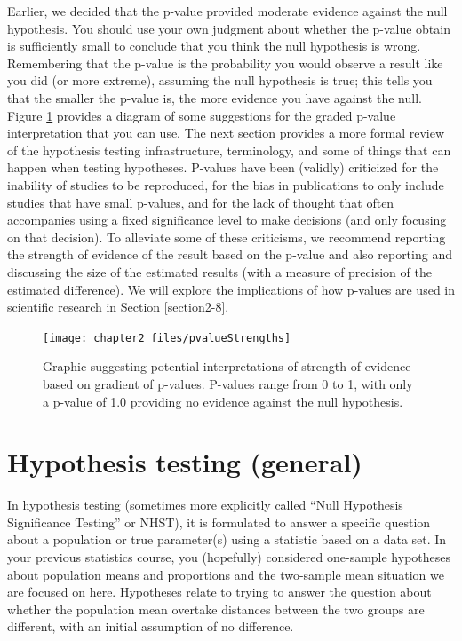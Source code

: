 \documentclass[
]{book}
\begin{document}
\indent Earlier, we decided that the p-value provided moderate evidence against
the null hypothesis. You should use your own judgment about whether the p-value obtain is sufficiently small to conclude that you think the null hypothesis is wrong. Remembering
that the p-value is the probability
you would observe a result like you did (or more extreme), assuming the null
hypothesis is true; this tells you that the smaller the p-value is, the more
evidence you have against the null. Figure \ref{fig:Figure2-11} provides a
diagram of some suggestions for the graded p-value interpretation that you can
use. The next section provides a more formal
review of the hypothesis testing
infrastructure, terminology, and some of
things that can happen when testing hypotheses. P-values have been (validly)
criticized for the inability of studies to be reproduced, for the bias in
publications to only include studies that have small p-values, and for the lack of
thought that often accompanies using a fixed significance level to make decisions (and only focusing on that decision). To alleviate
some of these criticisms, we recommend reporting the strength of evidence of the
result based on the p-value and also reporting and discussing the size of the
estimated results (with a measure of precision of the estimated difference). We will explore the implications of how p-values are used in scientific research in Section \ref{section2-8}.



\begin{figure}[ht!]

{\centering \texttt{[image: chapter2\_files/pvalueStrengths]} 

}

\caption{Graphic suggesting potential interpretations of strength of evidence based on gradient of p-values. P-values range from 0 to 1, with only a p-value of 1.0 providing no evidence against the null hypothesis.}\label{fig:Figure2-11}
\end{figure}

\newpage

\hypertarget{section2-5}{%
\section{Hypothesis testing (general)}\label{section2-5}}

In hypothesis testing
(sometimes more explicitly called ``Null Hypothesis
Significance Testing'' or NHST), it is formulated to answer a specific question about
a population or true parameter(s) using a statistic based on a data set.
In your previous statistics course, you (hopefully) considered one-sample
hypotheses about population means and proportions and the two-sample mean
situation we are focused on here. Hypotheses relate to trying to answer
the question about whether the population mean overtake distances between the two
groups are different, with an initial assumption of no difference.
\end{document}
